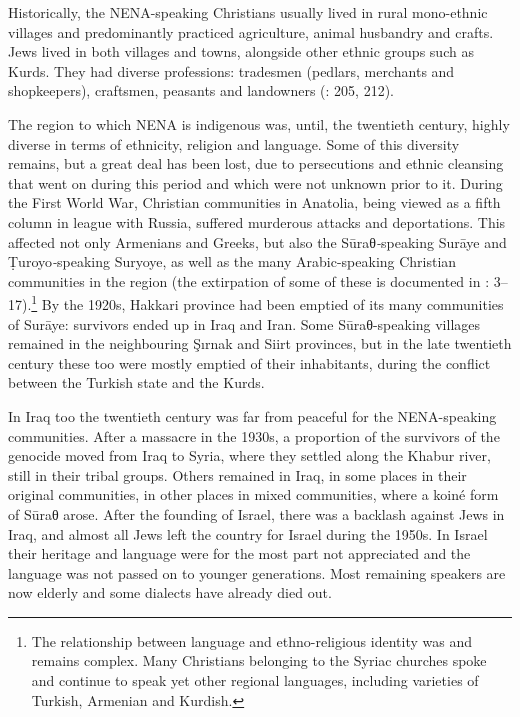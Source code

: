 \documentclass[output=paper]{langsci/langscibook}
\begin{document}
Historically, the NENA-speaking Christians usually lived in rural mono-ethnic villages and predominantly practiced agriculture, animal husbandry and crafts. Jews lived in both villages and towns, alongside other ethnic groups such as Kurds. They had diverse professions: tradesmen (pedlars, merchants and shopkeepers), craftsmen, peasants and landowners (\citealt{BrauerPatai1993}: 205, 212).

The region to which NENA is indigenous was, until, the twentieth century, highly diverse in terms of ethnicity, religion and language. Some of this diversity remains, but a great deal has been lost, due to persecutions and ethnic cleansing that went on during this period and which were not unknown prior to it. During the First World War, Christian communities in Anatolia, being viewed as a fifth column in league with Russia, suffered murderous attacks and deportations. This affected not only Armenians and Greeks, but also the Sūraθ\textit{{}-}speaking Surāye and Ṭuroyo\textit{{}-}speaking Suryoye, as well as the many Arabic-speaking Christian communities in the region (the extirpation of some of these is documented in \citealt{Jastrow1978}: 3–17).\footnote{The relationship between language and ethno-religious identity was and remains complex. Many Christians belonging to the Syriac churches spoke and continue to speak yet other regional languages, including varieties of Turkish, Armenian and Kurdish.} By the 1920s, Hakkari province had been emptied of its many communities of Surāye: survivors ended up in Iraq and Iran. Some Sūraθ-speaking villages remained in the neighbouring Şırnak and Siirt provinces, but in the late twentieth century these too were mostly emptied of their inhabitants, during the conflict between the Turkish state and the Kurds.

In Iraq too the twentieth century was far from peaceful for the NENA-speaking communities. After a massacre in the 1930s, a proportion of the survivors of the genocide moved from Iraq to Syria, where they settled along the Khabur river, still in their tribal groups. Others remained in Iraq, in some places in their original communities, in other places in mixed communities, where a koiné form of Sūraθ arose. After the founding of Israel, there was a backlash against Jews in Iraq, and almost all Jews left the country for Israel during the 1950s. In Israel their heritage and language were for the most part not appreciated and the language was not passed on to younger generations. Most remaining speakers are now elderly and some dialects have already died out.
\end{document}
